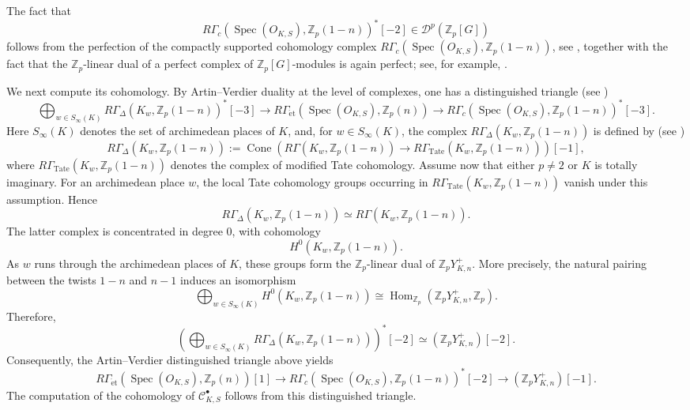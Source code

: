 \documentclass[a4paper,11pt]{article}
\newenvironment{proof}[1][Proof]{\begin{trivlist}
\item[\hskip \labelsep {\bfseries #1}]}{\end{trivlist}}
\newcommand{\qed}{\nobreak \ifvmode \relax \else
    \ifdim\lastskip<1.5em \hskip-\lastskip
     \hskip1.5em plus0em minus0.5em \fi \nobreak
      \vrule height0.75em width0.5em depth0.25em\fi}
\begin{document}
\begin{proof}
The fact that
\[
R\Gamma_c(\operatorname{Spec}(O_{K,S}),\mathbb Z_p(1-n))^*[-2]
\in
\mathcal D^p(\mathbb Z_p[G])
\]
follows from the perfection of the compactly supported cohomology complex
\(R\Gamma_c(\operatorname{Spec}(O_{K,S}),\mathbb Z_p(1-n))\), see
\cite[Proposition~1.20]{BurnsFlach}, together with the fact that the
\(\mathbb Z_p\)-linear dual of a perfect complex of \(\mathbb Z_p[G]\)-modules
is again perfect; see, for example, \cite[\S 3]{BunsG1}.

\noindent We next compute its cohomology. By Artin--Verdier duality at the level of
complexes, one has a distinguished triangle (see \cite[Proposition~4.1]{BurnsFlach2})
\[
\bigoplus_{w\in S_\infty(K)}
R\Gamma_\Delta(K_w,\mathbb Z_p(1-n))^*[-3]
\longrightarrow
R\Gamma_{\mathrm{\acute{e}t}}(\operatorname{Spec}(O_{K,S}),\mathbb Z_p(n))
\longrightarrow
R\Gamma_c(\operatorname{Spec}(O_{K,S}),\mathbb Z_p(1-n))^*[-3].
\]
 Here \(S_\infty(K)\) denotes the set
of archimedean places of \(K\), and, for \(w\in S_\infty(K)\), the complex
\(R\Gamma_\Delta(K_w,\mathbb Z_p(1-n))\) is defined by (see \cite[Eq. (82)]{BurnsFlach2})
\[
R\Gamma_\Delta(K_w,\mathbb Z_p(1-n))
:=
\operatorname{Cone}
\left(
R\Gamma(K_w,\mathbb Z_p(1-n))
\longrightarrow
R\Gamma_{\mathrm{Tate}}(K_w,\mathbb Z_p(1-n))
\right)[-1],
\]
where \(R\Gamma_{\mathrm{Tate}}(K_w,\mathbb Z_p(1-n))
\) denotes the complex of modified Tate cohomology. Assume now that either \(p\neq 2\) or \(K\) is totally imaginary. For an
archimedean place \(w\), the local Tate cohomology groups occurring in
\(R\Gamma_{\mathrm{Tate}}(K_w,\mathbb Z_p(1-n))\) vanish under this assumption.
Hence
\[
R\Gamma_\Delta(K_w,\mathbb Z_p(1-n))
\simeq
R\Gamma(K_w,\mathbb Z_p(1-n)).
\]
The latter complex is concentrated in degree \(0\), with cohomology
\[
H^0(K_w,\mathbb Z_p(1-n)).
\]
As \(w\) runs through the archimedean places of \(K\), these groups form the
\(\mathbb Z_p\)-linear dual of \(\mathbb{Z}_pY_{K,n}^{+}\).
More precisely, the natural pairing between the twists \(1-n\) and \(n-1\)
induces an isomorphism
\[
\bigoplus_{w\in S_\infty(K)}
H^0(K_w,\mathbb Z_p(1-n))
\cong
\operatorname{Hom}_{\mathbb Z_p}
\left(
\mathbb{Z}_pY_{K,n}^{+},
\mathbb Z_p
\right).
\]
Therefore,
\[
\left(
\bigoplus_{w\in S_\infty(K)}
R\Gamma_\Delta(K_w,\mathbb Z_p(1-n))
\right)^*[-2]
\simeq
\left(\mathbb{Z}_pY_{K,n}^{+}\right)[-2].
\]
Consequently, the Artin--Verdier distinguished triangle above yields
\begin{equation}\label{étale_to_compact-support}
R\Gamma_{\mathrm{\acute{e}t}}(\operatorname{Spec}(O_{K,S}),\mathbb Z_p(n))[1]
\longrightarrow
R\Gamma_c(\operatorname{Spec}(O_{K,S}),\mathbb Z_p(1-n))^*[-2]
\longrightarrow
\left(\mathbb{Z}_pY_{K,n}^{+}\right)[-1].
\end{equation}
The computation of the cohomology of $\mathcal{C}_{K,S}^\bullet$ follows from this distinguished triangle.\qed
\end{proof}
\end{document}
